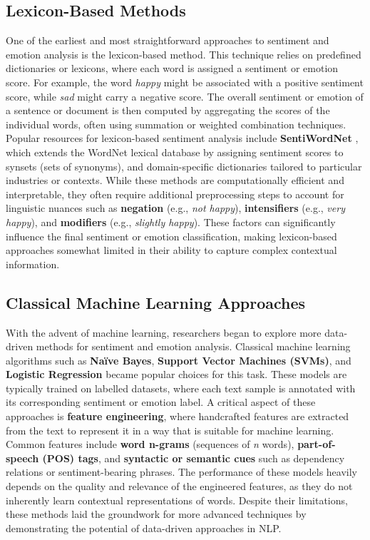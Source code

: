 \subsection*{Lexicon-Based Methods}

One of the earliest and most straightforward approaches to sentiment and emotion analysis is the lexicon-based method. This technique relies on predefined dictionaries or lexicons, where each word is assigned a sentiment or emotion score. For example, the word \textit{happy} might be associated with a positive sentiment score, while \textit{sad} might carry a negative score. The overall sentiment or emotion of a sentence or document is then computed by aggregating the scores of the individual words, often using summation or weighted combination techniques. 
\newline
Popular resources for lexicon-based sentiment analysis include \textbf{SentiWordNet} \cite{baccianella-etal-2010-sentiwordnet}, which extends the WordNet lexical database by assigning sentiment scores to synsets (sets of synonyms), and domain-specific dictionaries tailored to particular industries or contexts. While these methods are computationally efficient and interpretable, they often require additional preprocessing steps to account for linguistic nuances such as \textbf{negation} (e.g., \textit{not happy}), \textbf{intensifiers} (e.g., \textit{very happy}), and \textbf{modifiers} (e.g., \textit{slightly happy}). These factors can significantly influence the final sentiment or emotion classification, making lexicon-based approaches somewhat limited in their ability to capture complex contextual information.

\subsection*{Classical Machine Learning Approaches}

With the advent of machine learning, researchers began to explore more data-driven methods for sentiment and emotion analysis. Classical machine learning algorithms such as \textbf{Na\"ive Bayes}, \textbf{Support Vector Machines (SVMs)}, and \textbf{Logistic Regression} became popular choices for this task. These models are typically trained on labelled datasets, where each text sample is annotated with its corresponding sentiment or emotion label. 
\newline
A critical aspect of these approaches is \textbf{feature engineering}, where handcrafted features are extracted from the text to represent it in a way that is suitable for machine learning. Common features include \textbf{word n-grams} (sequences of \textit{n} words), \textbf{part-of-speech (POS) tags}, and \textbf{syntactic or semantic cues} such as dependency relations or sentiment-bearing phrases. The performance of these models heavily depends on the quality and relevance of the engineered features, as they do not inherently learn contextual representations of words. Despite their limitations, these methods laid the groundwork for more advanced techniques by demonstrating the potential of data-driven approaches in NLP.

